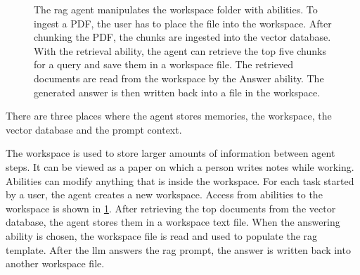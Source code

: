 \documentclass[../main.tex]{subfiles}
\begin{document}
\begin{figure}[t]
    \centering
    \caption{The \gls{rag} agent manipulates the \textcolor{emph red}{workspace}
        folder with \textcolor{emph blue}{abilities}.
        To ingest a PDF, the user has to place the file into the workspace.
        After chunking the PDF, the chunks are ingested into the vector database.
        With the retrieval ability,
        the agent can retrieve the top five chunks for a query
        and save them in a workspace file.
        The retrieved documents are read from the workspace by the Answer ability.
        The generated answer is then written back into a file in the workspace.}
    \label{fig:abilities_workspace}
\end{figure}


There are three places where the agent stores memories, the workspace,
the vector database and the prompt context.

The workspace is used to store larger amounts of information between agent steps.
It can be viewed as a paper on which a person writes notes while working.
Abilities can modify anything that is inside the workspace.
For each task started by a user, the agent creates a new workspace.
Access from abilities to the workspace is shown in \ref{fig:abilities_workspace}.
After retrieving the top documents from the vector database, the agent stores
them in a workspace text file.
When the answering ability is chosen, the workspace file is read and used to populate
the \gls{rag} template.
After the \gls{llm} answers the \gls{rag} prompt, the answer is written back
into another workspace file.
\end{document}
